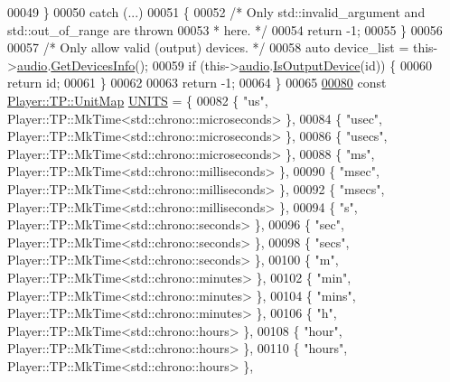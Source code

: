 \begin{DoxyCode}
00049     \}
00050     \textcolor{keywordflow}{catch} (...)
00051     \{
00052         \textcolor{comment}{/* Only std::invalid\_argument and std::out\_of\_range are thrown}
00053 \textcolor{comment}{         * here. */}
00054         \textcolor{keywordflow}{return} -1;
00055     \}
00056 
00057     \textcolor{comment}{/* Only allow valid (output) devices. */}
00058     \textcolor{keyword}{auto} device\_list = this->\hyperlink{classplayd_a2c7193680bd18f1e9b3f63f2234485de}{audio}.\hyperlink{classAudioSystem_aa268faeb9243c18588631024958856e6}{GetDevicesInfo}();
00059     \textcolor{keywordflow}{if} (this->\hyperlink{classplayd_a2c7193680bd18f1e9b3f63f2234485de}{audio}.\hyperlink{classAudioSystem_a001cd82f854883b80b3ed7d35795581b}{IsOutputDevice}(\textcolor{keywordtype}{id})) \{
00060         \textcolor{keywordflow}{return} id;
00061     \}
00062 
00063     \textcolor{keywordflow}{return} -1;
00064 \}
00065 
\hypertarget{main_8cpp_source_l00080}{}\hyperlink{main_8cpp_a889c521ce751c2db7ba216a612c1d784}{00080} \textcolor{keyword}{const} \hyperlink{classTimeParser_adc32afc638ace5060a2134f8f74d3c60}{Player::TP::UnitMap} \hyperlink{main_8cpp_a889c521ce751c2db7ba216a612c1d784}{UNITS} = \{
00082     \{ \textcolor{stringliteral}{"us"}, Player::TP::MkTime<std::chrono::microseconds> \},
00084     \{ \textcolor{stringliteral}{"usec"}, Player::TP::MkTime<std::chrono::microseconds> \},
00086     \{ \textcolor{stringliteral}{"usecs"}, Player::TP::MkTime<std::chrono::microseconds> \},
00088     \{ \textcolor{stringliteral}{"ms"}, Player::TP::MkTime<std::chrono::milliseconds> \},
00090     \{ \textcolor{stringliteral}{"msec"}, Player::TP::MkTime<std::chrono::milliseconds> \},
00092     \{ \textcolor{stringliteral}{"msecs"}, Player::TP::MkTime<std::chrono::milliseconds> \},
00094     \{ \textcolor{stringliteral}{"s"}, Player::TP::MkTime<std::chrono::seconds> \},
00096     \{ \textcolor{stringliteral}{"sec"}, Player::TP::MkTime<std::chrono::seconds> \},
00098     \{ \textcolor{stringliteral}{"secs"}, Player::TP::MkTime<std::chrono::seconds> \},
00100     \{ \textcolor{stringliteral}{"m"}, Player::TP::MkTime<std::chrono::minutes> \},
00102     \{ \textcolor{stringliteral}{"min"}, Player::TP::MkTime<std::chrono::minutes> \},
00104     \{ \textcolor{stringliteral}{"mins"}, Player::TP::MkTime<std::chrono::minutes> \},
00106     \{ \textcolor{stringliteral}{"h"}, Player::TP::MkTime<std::chrono::hours> \},
00108     \{ \textcolor{stringliteral}{"hour"}, Player::TP::MkTime<std::chrono::hours> \},
00110     \{ \textcolor{stringliteral}{"hours"}, Player::TP::MkTime<std::chrono::hours> \},

\end{DoxyCode}
